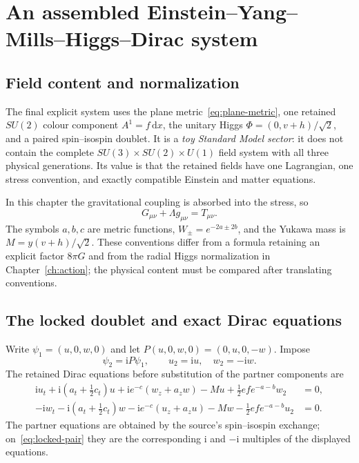 \documentclass[11pt,a4paper,oneside]{book}
\theoremstyle{plain}
\theoremstyle{definition}
\theoremstyle{remark}
\newcommand{\dd}{\mathrm d}
\newcommand{\ii}{\mathrm i}
\begin{document}
\chapter{An assembled Einstein--Yang--Mills--Higgs--Dirac system}
\label{ch:coupled}
\section{Field content and normalization}
The final explicit system uses the plane metric~\eqref{eq:plane-metric}, one retained $SU(2)$ colour component $A^1=f\,\dd x$, the unitary Higgs $\Phi=(0,v+h)/\sqrt2$, and a paired spin--isospin doublet. It is a \emph{toy Standard Model sector}: it does not contain the complete $SU(3)\times SU(2)\times U(1)$ field system with all three physical generations. Its value is that the retained fields have one Lagrangian, one stress convention, and exactly compatible Einstein and matter equations.

In this chapter the gravitational coupling is absorbed into the stress, so
\begin{equation}
 G_{\mu\nu}+\Lambda g_{\mu\nu}=T_{\mu\nu}.
 \label{eq:toy-einstein}
\end{equation}
The symbols $a,b,c$ are metric functions, $W_\pm=e^{-2a\pm2b}$, and the Yukawa mass is $M=y(v+h)/\sqrt2$. These conventions differ from a formula retaining an explicit factor $8\pi G$ and from the radial Higgs normalization in Chapter~\ref{ch:action}; the physical content must be compared after translating conventions.

\section{The locked doublet and exact Dirac equations}
Write $\psi_1=(u,0,w,0)$ and let $P(u,0,w,0)=(0,u,0,-w)$. Impose
\begin{equation}
 \psi_2=\ii P\psi_1,
 \qquad u_2=\ii u,\quad w_2=-\ii w.
 \label{eq:locked-pair}
\end{equation}
The retained Dirac equations before substitution of the partner components are
\begin{align}
 \ii u_t+\ii(a_t+\tfrac12c_t)u
 +\ii e^{-c}(w_z+a_zw)-Mu
 +\tfrac12ef e^{-a-b}w_2&=0,\label{eq:dirac-u}\\
 -\ii w_t-\ii(a_t+\tfrac12c_t)w
 -\ii e^{-c}(u_z+a_zu)-Mw
 -\tfrac12ef e^{-a-b}u_2&=0.\label{eq:dirac-w}
\end{align}
The partner equations are obtained by the source's spin--isospin exchange; on~\eqref{eq:locked-pair} they are the corresponding $\ii$ and $-\ii$ multiples of the displayed equations.
\end{document}
